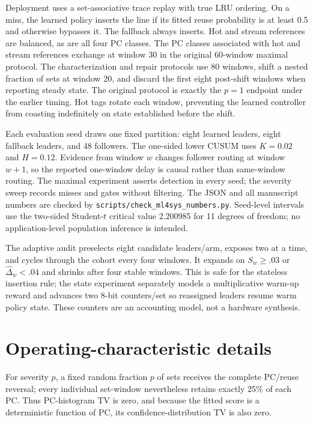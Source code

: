 \documentclass{article}
\newcommand{\dhat}{\hat{\Delta}}
\begin{document}
Deployment uses a set-associative trace replay with true LRU ordering.  On a
miss, the learned policy inserts the line if its fitted reuse probability is at
least 0.5 and otherwise bypasses it.  The fallback always inserts.  Hot and
stream references are balanced, as are all four PC classes.  The PC classes
associated with hot and stream references exchange at window 30 in the original
60-window maximal protocol.  The characterization and repair protocols use 80
windows, shift a nested fraction of sets at window 20, and discard the first eight
post-shift windows when reporting steady state.  The original protocol is exactly
the $p=1$ endpoint under the earlier timing.  Hot tags rotate each window,
preventing the learned controller from coasting indefinitely on state established
before the shift.

Each evaluation seed draws one fixed partition: eight learned leaders,
eight fallback leaders, and 48 followers.  The one-sided lower CUSUM uses
$K=0.02$ and $H=0.12$.  Evidence from window $w$ changes follower routing at
window $w+1$, so the reported one-window delay is causal rather than same-window
routing.  The maximal experiment asserts detection in every seed; the severity
sweep records misses and gates without filtering.  The JSON and all manuscript
numbers are checked by \texttt{scripts/check\_ml4sys\_numbers.py}.  Seed-level
intervals use the two-sided Student-$t$ critical value 2.200985 for 11 degrees of
freedom; no application-level population inference is intended.

The adaptive audit preselects eight candidate leaders/arm, exposes two at a time,
and cycles through the cohort every four windows.  It expands on
$S_w\ge.03$ or $\dhat_w<.04$ and shrinks after four stable windows.  This is safe
for the stateless insertion rule; the state experiment separately models a
multiplicative warm-up reward and advances two 8-bit counters/set so reassigned
leaders resume warm policy state.  These counters are an accounting model, not a
hardware synthesis.

\section{Operating-characteristic details}

For severity $p$, a fixed random fraction $p$ of sets receives the complete
PC/reuse reversal; every individual set-window nevertheless retains exactly
25\% of each PC.  Thus PC-histogram TV is zero, and because the fitted score is a
deterministic function of PC, its confidence-distribution TV is also zero.
\end{document}
